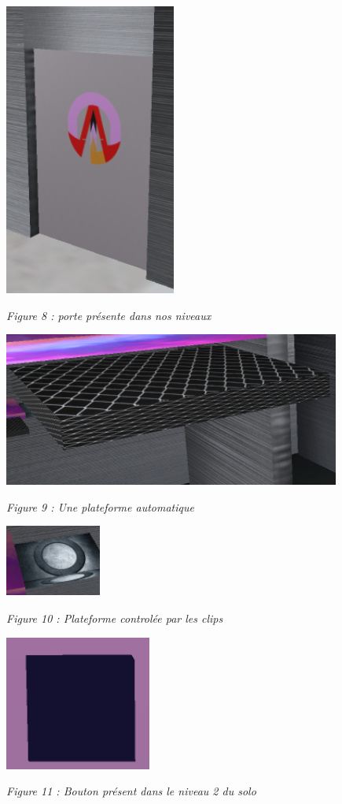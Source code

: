 \documentclass[a4paper , 12pt]{article}
\begin{document}
\begin {centering}

\quad


\includegraphics[scale = 0.3]{Porte.png}

\quad

\textit{Figure 8 : porte présente dans nos niveaux}

\quad

\includegraphics[scale = 0.5]{Plateforme.png}

\quad

\textit{Figure 9 : Une plateforme automatique}

\quad

\includegraphics[scale = 0.5]{Plateforme2.png}

\quad

\textit{Figure 10 : Plateforme controlée par les clips}

\quad

\includegraphics[scale = 0.5]{Bouton.png}

\quad

\textit{Figure 11 : Bouton présent dans le niveau 2 du solo}

\end{centering}
\end{document}

